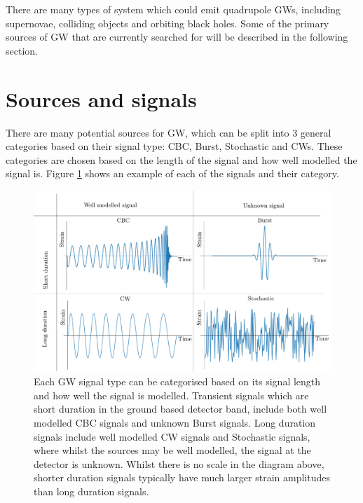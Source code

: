There are many types of system which could emit quadrupole \glspl{GW}, including supernovae, colliding objects and orbiting black holes. 
Some of the primary sources of \gls{GW} that are currently searched for will be described in the following section.




\section{\label{intro:sources}Sources and signals}

There are many potential sources for \gls{GW}, which can be split into 3
general categories based on their signal type: \gls{CBC}, Burst, Stochastic and
\glspl{CW}.  These categories are chosen based on the length of the signal and
how well modelled the signal is.  Figure \ref{intro:sources:signaltypes} shows
an example of each of the signals and their category.
%
\begin{figure}[h]
    \centering
    \includegraphics[width=\textwidth]{C1_intro/sources_types.pdf}
    \caption[GW signal types]{Each \gls{GW} signal type can be categorised
based on its signal length and how well the signal is modelled. Transient
signals which are short duration in the ground based detector band, include
both well modelled \gls{CBC} signals and unknown Burst signals. Long duration
signals include well modelled \gls{CW} signals and Stochastic
signals, where whilst the sources may be well modelled, the signal at the detector is unknown.
Whilst there is no scale in the diagram above, shorter duration signals typically have much larger strain amplitudes than long duration signals.}
\label{intro:sources:signaltypes}
\end{figure}

